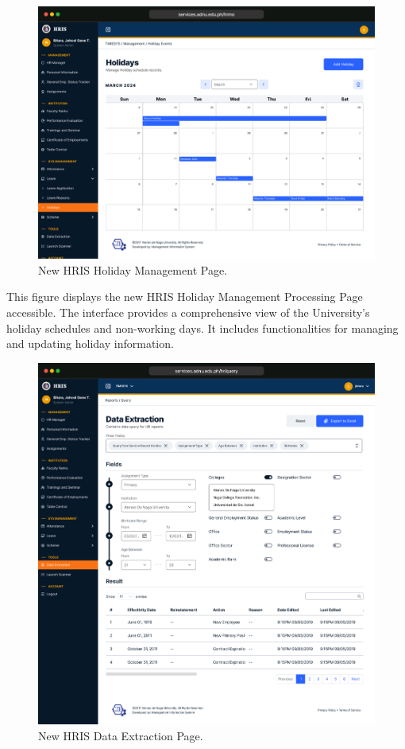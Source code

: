     \begin{figure}[H]
        \centering
        \includegraphics[width=1\linewidth]{figures/app/holiday.png}
        \caption{New HRIS Holiday Management Page.}
        \label{fig:holiday}
    \end{figure}

    This figure displays the new HRIS Holiday Management Processing Page accessible. The interface provides a comprehensive view of the University's holiday schedules and non-working days. It includes functionalities for managing and updating holiday information.

    \begin{figure}[H]
        \centering
        \includegraphics[width=1\linewidth]{figures/app/data-extraction.png}
        \caption{New HRIS Data Extraction Page.}
        \label{fig:app-data-extraction}
    \end{figure}

